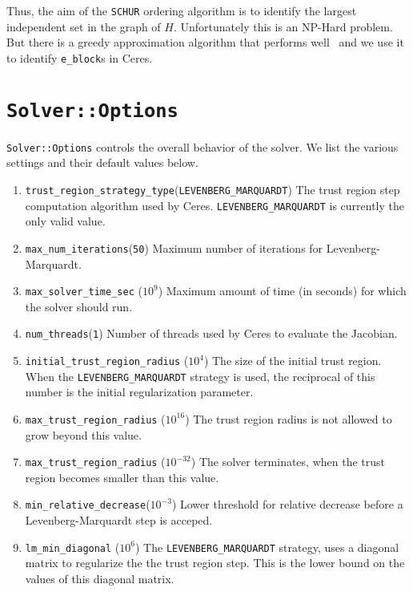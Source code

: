 Thus, the aim of the \texttt{SCHUR} ordering algorithm is to identify the largest independent set in the graph of $H$. Unfortunately this is an NP-Hard problem. But there is a  greedy approximation algorithm that performs well~\cite{li2007miqr} and we use it to identify \texttt{e\_block}s in Ceres.

\section{\texttt{Solver::Options}}

\texttt{Solver::Options} controls the overall behavior of the solver. We list the various settings and their default values below.

\begin{enumerate}
    
\item{\texttt{trust\_region\_strategy\_type}}(\texttt{LEVENBERG\_MARQUARDT}) The  trust region step computation algorithm used by Ceres. \texttt{LEVENBERG\_MARQUARDT} is currently the only valid value.

\item{\texttt{max\_num\_iterations}}(\texttt{50}) Maximum number of iterations for Levenberg-Marquardt.

\item{\texttt{max\_solver\_time\_sec}} ($10^9$) Maximum amount of time (in seconds) for which the solver should run.

\item{\texttt{num\_threads}}(\texttt{1})
Number of threads used by Ceres to evaluate the Jacobian.

\item{\texttt{initial\_trust\_region\_radius} ($10^4$)} The size of the initial trust region. When the \texttt{LEVENBERG\_MARQUARDT} strategy is used, the reciprocal of this number is the initial regularization parameter.

\item{\texttt{max\_trust\_region\_radius} ($10^{16}$)} The trust region radius is not allowed to grow beyond this value.
\item{\texttt{max\_trust\_region\_radius} ($10^{-32}$)} The solver terminates, when the trust region becomes smaller than this value.

\item{\texttt{min\_relative\_decrease}}($10^{-3}$) Lower threshold for relative decrease before a Levenberg-Marquardt step is acceped.

\item{\texttt{lm\_min\_diagonal} ($10^6$)} The \texttt{LEVENBERG\_MARQUARDT} strategy, uses a diagonal matrix to regularize the the trust region step. This is the lower bound on the values of this diagonal matrix.


\end{enumerate}
